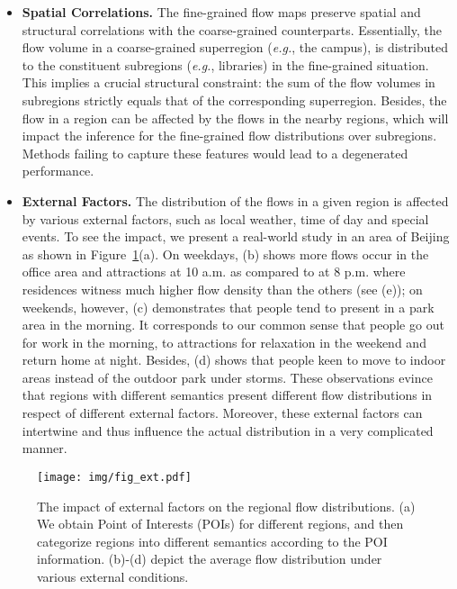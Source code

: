 \begin{itemize}[leftmargin=*]
\item{\textbf{Spatial Correlations.} The fine-grained flow maps preserve spatial and structural correlations with the coarse-grained counterparts. Essentially, the flow volume in a coarse-grained superregion (\textit{e.g.}, the campus), is distributed to the constituent subregions (\textit{e.g.}, libraries) in the fine-grained situation. This implies a crucial structural constraint: the sum of the flow volumes in subregions strictly equals that of the corresponding superregion. Besides, the flow in a region can be affected by the flows in the nearby regions, which will impact the inference for the fine-grained flow distributions over subregions. Methods failing to capture these features would lead to a degenerated performance.}

\item{\textbf{External Factors.} The distribution of the flows in a given region is affected by various external factors, such as local weather, time of day and special events. To see the impact, we present a real-world study in an area of Beijing as shown in Figure~\ref{fig:ext_inf}(a). On weekdays, (b) shows more flows occur in the office area and attractions at 10 a.m. as compared to at 8 p.m. where residences witness much higher flow density than the others (see (e)); on weekends, however, (c) demonstrates that people tend to present in a park area in the morning. It corresponds to our common sense that people go out for work in the morning, to attractions for relaxation in the weekend and return home at night. Besides, (d) shows that people keen to move to indoor areas instead of the outdoor park under storms. These observations evince that regions with different semantics present different flow distributions in respect of different external factors. Moreover, these external factors can intertwine and thus influence the actual distribution in a very complicated manner.}

\end{itemize}

\begin{figure}[!t]
	\centering
	\texttt{[image: img/fig\_ext.pdf]}
	\vspace{-1.5em}
	\caption{\label{fig:ext_inf} The impact of external factors on the regional flow distributions. (a) We obtain Point of Interests (POIs) for different regions, and then categorize regions into different semantics according to the POI information. (b)-(d) depict the average flow distribution under various external conditions.}
	\vspace{-0.5em}
\end{figure}

